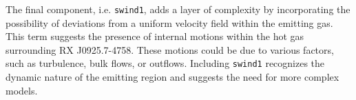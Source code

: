 			The final component, i.e. \texttt{swind1}, adds a layer of complexity by incorporating the possibility of deviations from a uniform velocity field within the emitting gas. This term suggests the presence of internal motions within the hot gas surrounding RX J0925.7-4758. These motions could be due to various factors, such as turbulence, bulk flows, or outflows. Including \texttt{swind1} recognizes the dynamic nature of the emitting region and suggests the need for more complex models. %
			
%			
%			
